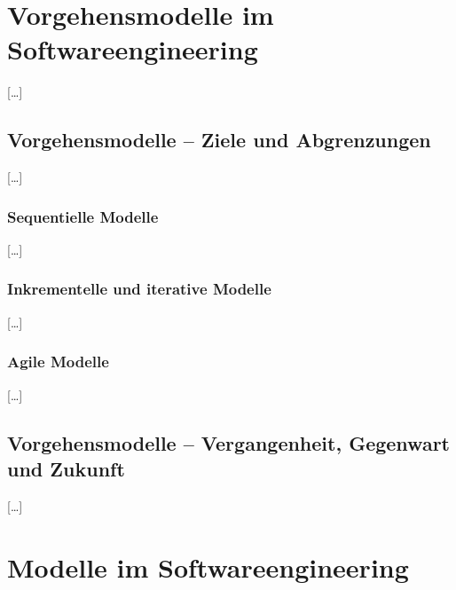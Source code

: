 \chapter{Vorgehensmodelle im Softwareengineering}
\label{sec:Kap-2}
[\ldots]

\section{Vorgehensmodelle – Ziele und Abgrenzungen}
\label{sec:Kap-2.1}
[\ldots]


\subsection{Sequentielle Modelle}
\label{sec:Kap-2.2.1}
[\ldots]

\subsection{Inkrementelle und iterative Modelle}
\label{sec:Kap-2.2.2}
[\ldots]

\subsection{Agile Modelle}
\label{sec:Kap-2.2.3}
[\ldots]

\section{Vorgehensmodelle – Vergangenheit, Gegenwart und Zukunft}
\label{sec:Kap-2.3}
[\ldots]


%
%
%	
%	




\chapter{Modelle im Softwareengineering}
\label{sec:Kap-3}

